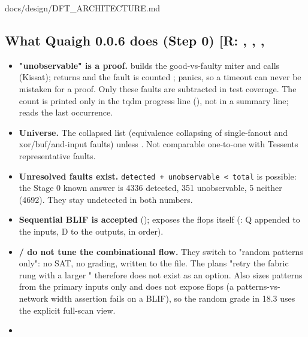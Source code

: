 \begin{relocated}{docs/design/DFT_ARCHITECTURE.md}
\subsection{\texorpdfstring{What Quaigh 0.0.6 does (Step 0) {[}R:
, , ,
\code{cmd.rs}{]}}{What Quaigh 0.0.6 does (Step 0) {[}R: , , , {]}}}\label{tm:ch:dft-architecture:181-what-quaigh-006-does-step-0-r-quaigh-006srcatpgrs-simfaultrs-equivrs-cmdrs}

\begin{itemize}
\tightlist
\item
  \textbf{"unobservable" is a proof.}
   builds the good-vs-faulty miter
  and calls  (Kissat);  returns  and
  the fault is counted ;  panics,
  so a timeout can never be mistaken for a proof. Only these faults are
  subtracted in test coverage. The count is printed only in the tqdm
  progress line (), not in a summary line;
   reads the last occurrence.
\item
  \textbf{Universe.} The collapsed list 
  (equivalence collapsing of single-fanout and
  xor/\allowbreak{}buf/\allowbreak{}and-input faults) unless
  . Not comparable one-to-one with
  Tessent\textquotesingle s representative faults.
\item
  \textbf{Unresolved faults exist.}
  \texttt{detected\ +\allowbreak{}\ unobservable\ <\ total} is possible:
  the Stage 0  known answer is 4336 detected, 351
  unobservable, 5 neither (4692). They stay undetected in both numbers.
\item
  \textbf{Sequential BLIF is accepted} (); 
  exposes the flops itself (: Q appended to the inputs,
  D to the outputs, in  order).
\item
  \textbf{ /  do not tune the
  combinational flow.} They switch to "random patterns only": no SAT, no
  grading, written to the file. The plan\textquotesingle s "retry the
  fabric rung with a larger " therefore does not
  exist as an option. Also  sizes patterns from the
  primary inputs only and does not expose flops (a patterns-vs-network
  width assertion fails on a  BLIF), so the random grade in
  18.3 uses the explicit full-scan view.
\item

\end{itemize}
\end{relocated}
